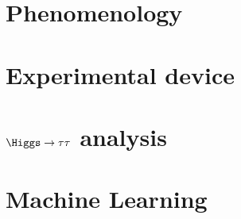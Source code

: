 \subsection*{}
\section{Phenomenology}


\subsection*{}
\section{Experimental device}



\subsection*{}
\section{$\Higgs\to\tau\tau$ analysis}


\subsection*{}
\section{Machine Learning}
